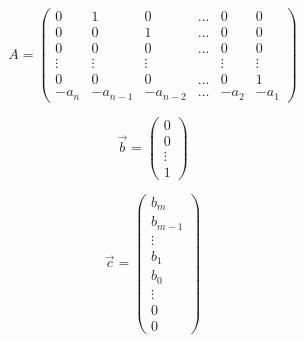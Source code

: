     \begin{equation}
        A =
        \begin{pmatrix}
        0 & 1 & 0 & \dots & 0 & 0 \\
        0 & 0 & 1 & \dots & 0 & 0 \\
        0 & 0 & 0 & \dots & 0 & 0 \\
        \vdots & \vdots & \vdots &   & \vdots & \vdots \\
        0 & 0 & 0 & \dots & 0 & 1 \\
        -a_n & -a_{n-1} & -a_{n-2} & \dots & -a_2 & -a_1
        \end{pmatrix}
    \end{equation}

    \begin{equation}
        \vec{b} =
        \begin{pmatrix}
        0 \\
        0 \\
        \vdots \\
        1
        \end{pmatrix}
    \end{equation}

    \begin{equation}
        \vec{c} =
        \begin{pmatrix}
        b_m     \\
        b_{m-1} \\
        \vdots  \\
        b_1     \\
        b_0     \\
        \vdots  \\
        0       \\
        0
        \end{pmatrix}
    \end{equation}

